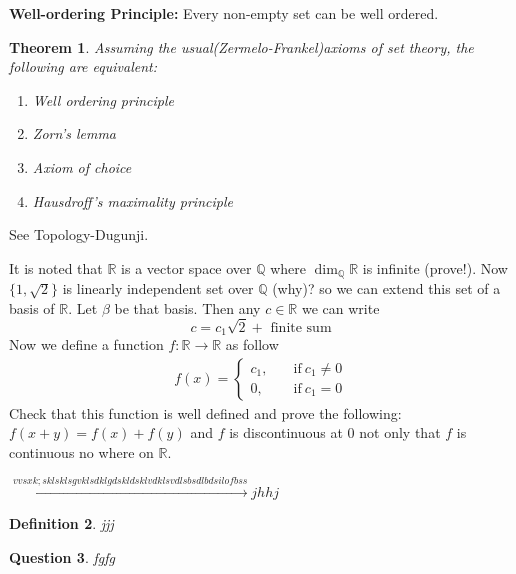 \documentclass[11pt]{amsart}
\newtheorem{theorem}{Theorem}[section]
\newtheorem{defn}[theorem]{Definition}
\newtheorem{qns}[theorem]{Question}
\newcommand{\QQ}{\mathbb Q}
\newcommand{\RR}{\mathbb R}
\begin{document}
\textbf{Well-ordering Principle:} Every non-empty set can be well ordered.
\begin{theorem}
Assuming the usual(Zermelo-Frankel)axioms of set theory, the following are equivalent:
\begin{enumerate}
\item Well ordering principle
\item Zorn's lemma
\item Axiom of choice
\item Hausdroff's maximality principle
\end{enumerate}
\end{theorem}
\proof See Topology-Dugunji. 











It is noted that ${\RR}$ is  a vector space over ${\QQ}$ where $\dim_{\QQ} {\RR}$ is infinite (prove!). Now $\{1,\sqrt{2}\}$ is linearly independent set over ${\QQ}$ (why)? so we can extend this set of a basis of ${\RR}$. Let $\beta$ be that basis. Then any $c\in {\RR}$ we can write $$c=c_1\sqrt{2}+\text{~finite sum}$$ Now we define a function $f:{\RR}\to {\RR}$ as follow \begin{align*}
f(x)=\begin{cases}
c_1,\quad&\text{if}~c_1\neq 0\\
0,\quad&\text{if}~c_1=0
\end{cases}
\end{align*} Check that this function is well defined and prove the following: $f(x+y)=f(x)+f(y)$ and $f$ is discontinuous at 0 not only that $f$ is continuous no where on ${\RR}.$















$\xrightarrow{vvsxk;sklsklsgvklsdklgdskldsklvdklsvdlsbsdlbdsilofbss}jhhj$



\begin{defn}
jjj
\end{defn}




\begin{qns}
fgfg
\end{qns}
\end{document}
